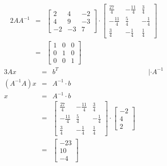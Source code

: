 \documentclass[10pt,a4paper,oneside,ngerman,numbers=noenddot]{scrartcl}
\begin{document}
\begin{alignat*}{2}
AA^{-1} &=&
\begin{bmatrix}
2 & 4 & -2 \\
4 & 9 & -3 \\
-2 & -3 & 7
\end{bmatrix} \cdot
\begin{bmatrix}
\frac{27}{4} & -\frac{11}{4} & \frac{3}{4} \\
-\frac{11}{4} & \frac{5}{4} & -\frac{1}{4} \\
\frac{3}{4} & -\frac{1}{4} & \frac{1}{4}
\end{bmatrix} \\
&=& \begin{bmatrix}
1 & 0 & 0 \\
0 & 1 & 0 \\
0 & 0 & 1
\end{bmatrix}
\end{alignat*}
\begin{alignat*}{3}
Ax &=& b^{T} && \;| \cdot A^{-1} \\
(A^{-1}A)x &=& A^{-1} \cdot b && \\
x &=& A^{-1} \cdot b && \\
&=& 
\begin{bmatrix}
\frac{27}{4} & -\frac{11}{4} & \frac{3}{4} \\
-\frac{11}{4} & \frac{5}{4} & -\frac{1}{4} \\
\frac{3}{4} & -\frac{1}{4} & \frac{1}{4}
\end{bmatrix} \cdot 
\begin{bmatrix}
-2 \\
4 \\
2
\end{bmatrix} \\
&=& 
\begin{bmatrix}
-23 \\
10 \\
-4
\end{bmatrix}
\end{alignat*}
\end{document}
